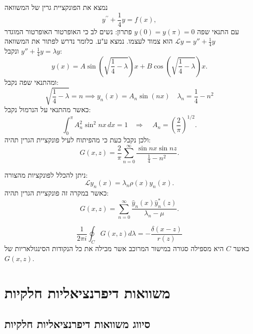 \documentclass{tstextbook}
\begin{document}
\begin{example}
נמצא את הפונקציית גרין של המשוואה $$y^{\prime\prime}+{\textstyle{\frac{1}{4}}}y=f(x),$$
עם התנאי שפה \(y(0)=y\left( \pi \right)=0\)
פתרון:
נשים לב כי האופרטור האופרטור המוגדר \(\mathcal{L}y=y''+\frac{1}{4}y\) הוא צמוד לעצמו. נמצא ע"ע. כלומר נדרש לפתור את המשוואה \(y''+\frac{1}{4}y=\lambda y\) ונקבל:
$$y(x)=A\sin\left(\sqrt{{\frac{1}{4}}-\lambda}\right)x+B\cos\left(\sqrt{{\frac{1}{4}}-\lambda}\right)x.$$
ומהתנאי שפה נקבל:
$$\sqrt{{\textstyle{\frac{1}{4}}}-\lambda}=n \implies y_{n}(x)=A_{n}\sin(nx)\quad \lambda_{n}=\frac{1}{4}-n^2$$
כאשר מהתנאי על הנרמול נקבל:
$$\int_{0}^{\pi}A_{n}^{2}\sin^{2}n x\,d x=1~~~~\Rightarrow~~~~~A_{n}=\left({\frac{2}{\pi}}\right)^{1/2}.$$
ולכן נקבל כעת כי מהפיתוח לעיל פונקציית הגרין תהיה:
$$G(x,z)={\frac{2}{\pi}}\sum_{n=0}^{\infty}{\frac{\sin n x\sin n z}{{\frac{1}{4}}-n^{2}}}.$$

\end{example}
\begin{proposition}
ניתן להכלל לפונקציות מהצורה:
$${\mathcal L}y_{n}(x)=\lambda_{n}\rho(x)y_{n}(x).$$
כאשר במקרה זה פונקציית הגרין תהיה:
$$G(x,z)=\sum_{n=0}^{\infty}{\frac{{\hat{y}}_{n}(x){\hat{y}}_{n}^{*}(z)}{\lambda_{n}-\mu}}.$$

\end{proposition}
\begin{corollary}
$$\frac{1}{2\pi i}\oint_{C} G(x,z)d\lambda=-\frac{\delta(x-z)}{r(z)}$$
כאשר \(C\) היא מספילה סגורה במישור המרוכב אשר מכילה את כל הנקודות הסינגולאריות של \(G(x,z)\).

\end{corollary}
\chapter{משוואות דיפרנציאליות חלקיות}

\section{סיווג משוואות דיפרנציאליות חלקיות}
\end{document}
